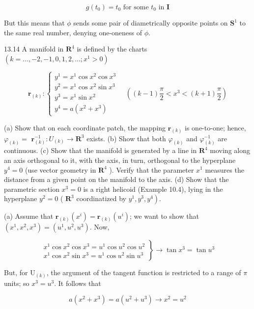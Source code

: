 \documentclass[10pt]{article}
\begin{document}
$$
g\left(t_{0}\right)=t_{0} \text { for some } t_{0} \text { in } \mathbf{I}
$$

But this means that $\phi$ sends some pair of diametrically opposite points on $\mathbf{S}^{1}$ to the same real number, denying one-oneness of $\phi$.

13.14 A manifold in $\mathbf{R}^{4}$ is defined by the charts $\left(k=\ldots,-2,-1,0,1,2, \ldots ; x^{1}>0\right)$

$$
\mathbf{r}_{(k)}:\left\{\begin{array}{l}
y^{1}=x^{1} \cos x^{2} \cos x^{3} \\
y^{2}=x^{1} \cos x^{2} \sin x^{3} \\
y^{3}=x^{1} \sin x^{2} \\
y^{4}=a\left(x^{2}+x^{3}\right)
\end{array} \quad\left((k-1) \frac{\pi}{2}<x^{3}<(k+1) \frac{\pi}{2}\right)\right.
$$

(a) Show that on each coordinate patch, the mapping $\mathbf{r}_{(k)}$ is one-to-one; hence, $\varphi_{(k)}=$ $\mathbf{r}_{(k)}^{-1}: U_{(k)} \rightarrow \mathbf{R}^{3}$ exists. (b) Show that both $\varphi_{(k)}$ and $\varphi_{(k)}^{-1}$ are continuous. (c) Show that the manifold is generated by a line in $\mathbf{R}^{4}$ moving along an axis orthogonal to it, with the axis, in turn, orthogonal to the hyperplane $y^{4}=0$ (use vector geometry in $\mathbf{R}^{4}$ ). Verify that the parameter $x^{1}$ measures the distance from a given point on the manifold to the axis. (d) Show that the parametric section $x^{3}=0$ is a right helicoid (Example 10.4), lying in the hyperplane $y^{2}=0$ ( $\mathbf{R}^{3}$ coordinatized by $\left.y^{1}, y^{3}, y^{4}\right)$.

(a) Assume that $\mathbf{r}_{(k)}\left(x^{i}\right)=\mathbf{r}_{(k)}\left(u^{i}\right)$; we want to show that $\left(x^{1}, x^{2}, x^{3}\right)=\left(u^{1}, u^{2}, u^{3}\right)$. Now,

$$
\left.\begin{array}{c}
x^{1} \cos x^{2} \cos x^{3}=u^{1} \cos u^{2} \cos u^{2} \\
x^{1} \cos x^{2} \sin x^{3}=u^{1} \cos u^{2} \sin u^{3}
\end{array}\right\} \rightarrow \tan x^{3}=\tan u^{3}
$$

But, for $\mathrm{U}_{(k)}$, the argument of the tangent function is restricted to a range of $\pi$ units; so $x^{3}=u^{3}$. It follows that

$$
a\left(x^{2}+x^{3}\right)=a\left(u^{2}+u^{3}\right) \rightarrow x^{2}=u^{2}
$$
\end{document}
